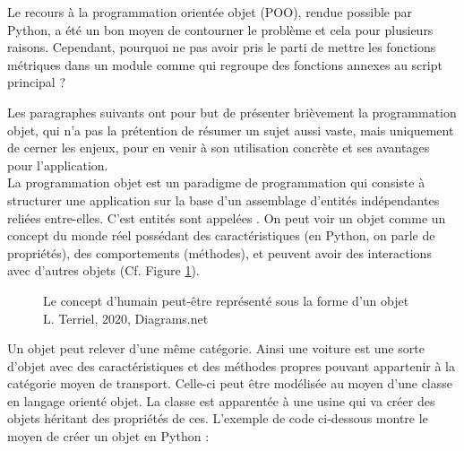 Le recours à la programmation orientée objet (POO), rendue possible par Python, a été un bon moyen de contourner le problème et cela pour plusieurs raisons. Cependant, pourquoi ne pas avoir pris le parti de mettre les fonctions métriques dans un module comme  qui regroupe des fonctions annexes au script principal ? 

Les paragraphes suivants ont pour but de présenter brièvement la programmation objet, qui n'a pas la prétention de résumer un sujet aussi vaste, mais uniquement de cerner les enjeux, pour en venir à son utilisation concrète et ses avantages pour l'application. \\

La programmation objet est un paradigme de programmation qui consiste à structurer une application sur la base d'un assemblage d'entités indépendantes reliées entre-elles. C'est entités sont appelées . On peut voir un objet comme un concept du monde réel possédant des caractéristiques (en Python, on parle de propriétés), des comportements (méthodes), et peuvent avoir des interactions avec d'autres objets (Cf. Figure \ref{fig:concept_POO}). 
\begin{figure}[h!]
    \centering
    \centerline{}
    \caption{Le concept d'humain peut-être représenté sous la forme d'un objet \textcopyright L. Terriel, 2020, Diagrams.net}
    \label{fig:concept_POO}
\end{figure}
\newpage
Un objet peut relever d'une même catégorie. Ainsi une voiture est une sorte d'objet avec des caractéristiques et des méthodes propres pouvant appartenir à la catégorie moyen de transport. Celle-ci peut être modélisée au moyen d'une classe en langage orienté objet. La classe est apparentée à une usine qui va créer des objets héritant des propriétés de ces. L'exemple de code ci-dessous montre le moyen de créer un objet  en Python :

